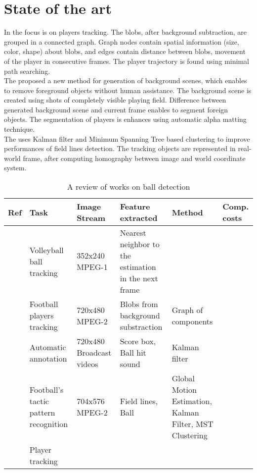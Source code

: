 \chapter{State of the art} \label{chap:State_of_the_art}

In \cite{Figueroa:2006dq} the focus is on players tracking. The blobs, after background subtraction,  are grouped  in a connected graph. Graph nodes contain spatial information (size, color, shape) about blobs, and edges contain distance between blobs, movement of the player in consecutive frames. The player trajectory is found using minimal path searching. \\

The \cite{Lai:2011gf} proposed a new method for generation of background scenes, which enables to remove foreground objects without human assistance. The background scene is created using shots of completely visible playing field. Difference between generated background scene and current frame enables to segment foreign objects. The segmentation of players is enhances using automatic alpha matting technique.\\

The \cite{Niu:2012dz} uses Kalman filter and Minimum Spanning Tree based clustering to improve performances of field lines detection. The tracking objects are represented in real-world frame, after computing homography between image and world coordinate system. 

 

\begin{table}[ht]
	\centering
	\begin{adjustbox}{width=1\textwidth, angle=0}
	\small
	\begin{tabular}{  l l l l l l   }
		\hline
		\textbf{Ref} & \textbf{Task} & \textbf{Image Stream} & \textbf{Feature extracted} & \textbf{Method} & \textbf{Comp. costs} \\ \hline
		\cite{Chen:2007jma} & Volleyball ball tracking & 352x240 MPEG-1 & Nearest neighbor to the estimation in the next frame &  &  \\
		
		\cite{Figueroa:2006dq} & Football players tracking & 720x480 MPEG-2  & Blobs from background substraction &  Graph of components  &  \\
		
		\cite{Lai:2011gf} & Automatic annotation  & 720x480 Broadcast videos   & Score box, Ball hit sound  & Kalman filter & \\
		
		\cite{Niu:2012dz} & Football's tactic pattern recognition  &  704x576 MPEG-2  & Field lines, Ball  & Global Motion Estimation, Kalman Filter, MST Clustering   & \\
		
		\cite{Fang:2014uz} & Player tracking & & & \\
		
		\hline
	\end{tabular}
	\end{adjustbox}
	\caption{A review of works on ball detection}
	\label{table:ReviewBallDetection}
\end{table}

